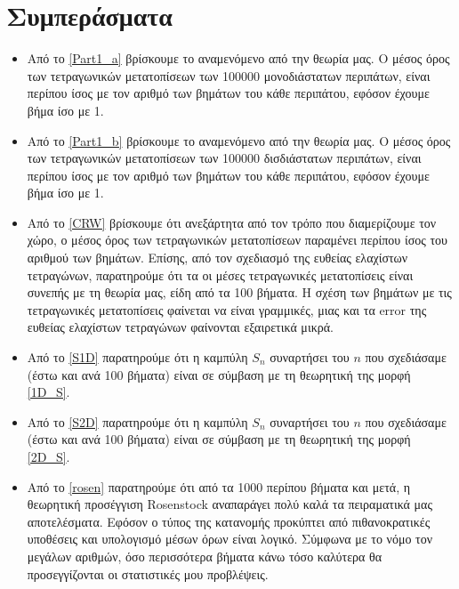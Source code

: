 \chapter{Συμπεράσματα}
\begin{itemize}
\item Από το \ref{Part1_a} βρίσκουμε το αναμενόμενο από την θεωρία μας. Ο μέσος όρος των τετραγωνικών μετατοπίσεων των 100000 μονοδιάστατων περιπάτων, είναι περίπου ίσος με τον αριθμό των βημάτων του κάθε περιπάτου, εφόσον έχουμε βήμα ίσο με 1.
\item Από το \ref{Part1_b} βρίσκουμε το αναμενόμενο από την θεωρία μας.  Ο μέσος όρος των τετραγωνικών μετατοπίσεων των 100000 δισδιάστατων περιπάτων, είναι περίπου ίσος με τον αριθμό των βημάτων του κάθε περιπάτου, εφόσον έχουμε βήμα ίσο με 1.
\item Από το \ref{CRW} βρίσκουμε ότι ανεξάρτητα από τον τρόπο που διαμερίζουμε τον χώρο, ο μέσος όρος των τετραγωνικών μετατοπίσεων παραμένει περίπου ίσος του αριθμού των βημάτων. Επίσης, από τον σχεδιασμό της ευθείας ελαχίστων τετραγώνων, παρατηρούμε ότι τα οι μέσες τετραγωνικές μετατοπίσεις είναι συνεπής με τη θεωρία μας, είδη από τα 100 βήματα. Η σχέση των βημάτων με τις τετραγωνικές μετατοπίσεις φαίνεται να είναι γραμμικές, μιας και τα {\en error} της ευθείας ελαχίστων τετραγώνων φαίνονται εξαιρετικά μικρά. 
\item
Από το \ref{S1D} παρατηρούμε ότι η καμπύλη $S_n$ συναρτήσει του $n$ που σχεδιάσαμε (έστω και ανά 100 βήματα) είναι σε σύμβαση με τη θεωρητική της μορφή \eqref{1D_S}.
\item
Από το \ref{S2D} παρατηρούμε ότι η καμπύλη $S_n$ συναρτήσει του $n$ που σχεδιάσαμε (έστω και ανά 100 βήματα) είναι σε σύμβαση με τη θεωρητική της μορφή \eqref{2D_S}.
\item Από το \ref{rosen} παρατηρούμε ότι από τα 1000 περίπου βήματα και μετά, η θεωρητική προσέγγιση {\en Rosenstock} αναπαράγει πολύ καλά τα πειραματικά μας αποτελέσματα. Εφόσον ο τύπος της κατανομής προκύπτει από πιθανοκρατικές υποθέσεις και υπολογισμό μέσων όρων είναι λογικό. Σύμφωνα με το νόμο τον μεγάλων αριθμών, όσο περισσότερα βήματα κάνω τόσο καλύτερα θα προσεγγίζονται οι στατιστικές μου προβλέψεις.
\end{itemize}